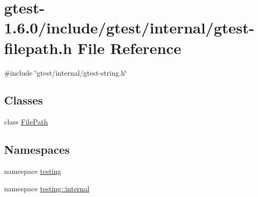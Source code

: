 \hypertarget{gtest-filepath_8h}{\section{gtest-\/1.6.0/include/gtest/internal/gtest-\/filepath.h \-File \-Reference}
\label{dc/d79/gtest-filepath_8h}
}
{\ttfamily \#include \char`\"{}gtest/internal/gtest-\/string.\-h\char`\"{}}\*
\subsection*{\-Classes}
\begin{DoxyCompactItemize}
\item 
class \hyperlink{classtesting_1_1internal_1_1FilePath}{\-File\-Path}
\end{DoxyCompactItemize}
\subsection*{\-Namespaces}
\begin{DoxyCompactItemize}
\item 
namespace \hyperlink{namespacetesting}{testing}
\item 
namespace \hyperlink{namespacetesting_1_1internal}{testing\-::internal}
\end{DoxyCompactItemize}
